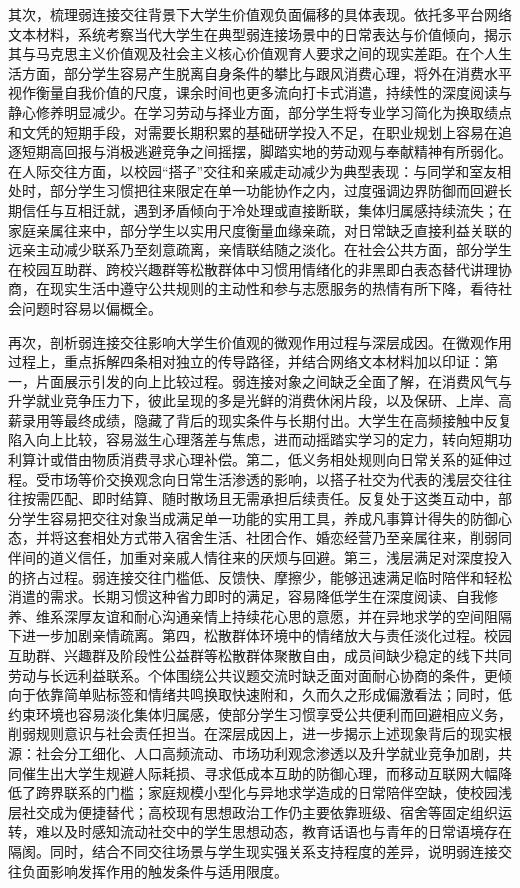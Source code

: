 其次，梳理弱连接交往背景下大学生价值观负面偏移的具体表现。依托多平台网络文本材料，系统考察当代大学生在典型弱连接场景中的日常表达与价值倾向，揭示其与马克思主义价值观及社会主义核心价值观育人要求之间的现实差距。在个人生活方面，部分学生容易产生脱离自身条件的攀比与跟风消费心理，将外在消费水平视作衡量自我价值的尺度，课余时间也更多流向打卡式消遣，持续性的深度阅读与静心修养明显减少。在学习劳动与择业方面，部分学生将专业学习简化为换取绩点和文凭的短期手段，对需要长期积累的基础研学投入不足，在职业规划上容易在追逐短期高回报与消极逃避竞争之间摇摆，脚踏实地的劳动观与奉献精神有所弱化。在人际交往方面，以校园“搭子”交往和亲戚走动减少为典型表现：与同学和室友相处时，部分学生习惯把往来限定在单一功能协作之内，过度强调边界防御而回避长期信任与互相迁就，遇到矛盾倾向于冷处理或直接断联，集体归属感持续流失；在家庭亲属往来中，部分学生以实用尺度衡量血缘亲疏，对日常缺乏直接利益关联的远亲主动减少联系乃至刻意疏离，亲情联结随之淡化。在社会公共方面，部分学生在校园互助群、跨校兴趣群等松散群体中习惯用情绪化的非黑即白表态替代讲理协商，在现实生活中遵守公共规则的主动性和参与志愿服务的热情有所下降，看待社会问题时容易以偏概全。

再次，剖析弱连接交往影响大学生价值观的微观作用过程与深层成因。在微观作用过程上，重点拆解四条相对独立的传导路径，并结合网络文本材料加以印证：第一，片面展示引发的向上比较过程。弱连接对象之间缺乏全面了解，在消费风气与升学就业竞争压力下，彼此呈现的多是光鲜的消费休闲片段，以及保研、上岸、高薪录用等最终成绩，隐藏了背后的现实条件与长期付出。大学生在高频接触中反复陷入向上比较，容易滋生心理落差与焦虑，进而动摇踏实学习的定力，转向短期功利算计或借由物质消费寻求心理补偿。第二，低义务相处规则向日常关系的延伸过程。受市场等价交换观念向日常生活渗透的影响，以搭子社交为代表的浅层交往往往按需匹配、即时结算、随时散场且无需承担后续责任。反复处于这类互动中，部分学生容易把交往对象当成满足单一功能的实用工具，养成凡事算计得失的防御心态，并将这套相处方式带入宿舍生活、社团合作、婚恋经营乃至亲属往来，削弱同伴间的道义信任，加重对亲戚人情往来的厌烦与回避。第三，浅层满足对深度投入的挤占过程。弱连接交往门槛低、反馈快、摩擦少，能够迅速满足临时陪伴和轻松消遣的需求。长期习惯这种省力即时的满足，容易降低学生在深度阅读、自我修养、维系深厚友谊和耐心沟通亲情上持续花心思的意愿，并在异地求学的空间阻隔下进一步加剧亲情疏离。第四，松散群体环境中的情绪放大与责任淡化过程。校园互助群、兴趣群及阶段性公益群等松散群体聚散自由，成员间缺少稳定的线下共同劳动与长远利益联系。个体围绕公共议题交流时缺乏面对面耐心协商的条件，更倾向于依靠简单贴标签和情绪共鸣换取快速附和，久而久之形成偏激看法；同时，低约束环境也容易淡化集体归属感，使部分学生习惯享受公共便利而回避相应义务，削弱规则意识与社会责任担当。在深层成因上，进一步揭示上述现象背后的现实根源：社会分工细化、人口高频流动、市场功利观念渗透以及升学就业竞争加剧，共同催生出大学生规避人际耗损、寻求低成本互助的防御心理，而移动互联网大幅降低了跨界联系的门槛；家庭规模小型化与异地求学造成的日常陪伴空缺，使校园浅层社交成为便捷替代；高校现有思想政治工作仍主要依靠班级、宿舍等固定组织运转，难以及时感知流动社交中的学生思想动态，教育话语也与青年的日常语境存在隔阂。同时，结合不同交往场景与学生现实强关系支持程度的差异，说明弱连接交往负面影响发挥作用的触发条件与适用限度。

